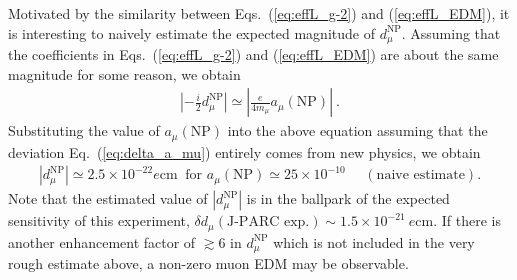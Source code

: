 Motivated by the similarity between Eqs.~(\ref{eq:effL_g-2}) 
and (\ref{eq:effL_EDM}), it is interesting to naively
estimate the expected magnitude of $d_\mu^{\text{NP}}$.
Assuming that the coefficients in Eqs.~(\ref{eq:effL_g-2}) 
and (\ref{eq:effL_EDM}) are about the same magnitude for
some reason, we obtain
%
\begin{align}
  \left| - \frac{i}{2} d_\mu^{\text{NP}} \right| \simeq 
   \left| \frac{e}{4m_\mu} a_\mu(\text{NP}) \right|~.
\end{align}
%
Substituting the value of $a_\mu(\text{NP})$ into the above
equation assuming that the deviation Eq.~(\ref{eq:delta_a_mu})
entirely comes from new physics, we obtain
%
\begin{align}
 |d_\mu^{\text{NP}}| \simeq 2.5 \times 10^{-22} e {\text{cm}}~
\text{ for } 
 a_\mu({\text{NP}}) \simeq 25 \times 10^{-10} 
~~~~~~(\text{naive estimate}).
\end{align}
%
Note that the estimated value of $|d_\mu^{\text{NP}}|$ is
in the ballpark of the expected sensitivity of this experiment,
$\delta d_\mu(\text{J-PARC exp.}) \sim 1.5 \times 
10^{-21} ~ e {\text{cm}}$.  If there is another enhancement
factor of $\gtrsim 6$ in $d_\mu^{\text{NP}}$ which
is not included in the very rough estimate above,
a non-zero muon EDM may be observable.


